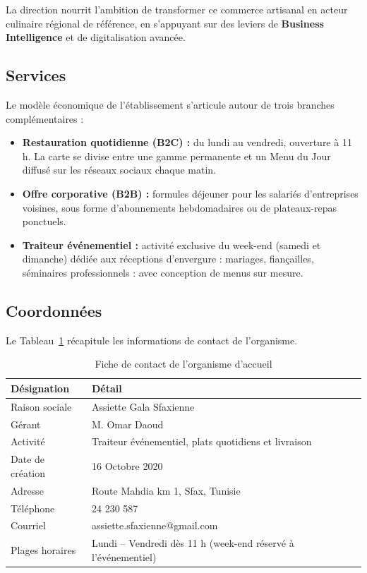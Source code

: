 La direction nourrit l'ambition de transformer ce commerce artisanal en acteur culinaire régional de référence, en s'appuyant sur des leviers de \textbf{Business Intelligence} et de digitalisation avancée.

\subsection{Services}

Le modèle économique de l'établissement s'articule autour de trois branches complémentaires :

\begin{itemize}
    \item \textbf{Restauration quotidienne (B2C) :} du lundi au vendredi, ouverture à 11 h. La carte se divise entre une gamme permanente et un \og Menu du Jour \fg{} diffusé sur les réseaux sociaux chaque matin.
    \item \textbf{Offre corporative (B2B) :} formules déjeuner pour les salariés d'entreprises voisines, sous forme d'abonnements hebdomadaires ou de plateaux-repas ponctuels.
    \item \textbf{Traiteur événementiel :} activité exclusive du week-end (samedi et dimanche) dédiée aux réceptions d'envergure : mariages, fiançailles, séminaires professionnels : avec conception de menus sur mesure.
\end{itemize}

\subsection{Coordonnées}

Le Tableau~\ref{tab:fiche_entreprise} récapitule les informations de contact de l'organisme.

\begin{table}[H]
    \centering
    \caption{Fiche de contact de l'organisme d'accueil}
    \label{tab:fiche_entreprise}
    \begin{tabular}{|l|p{8cm}|}
        \hline
        \textbf{Désignation} & \textbf{Détail} \\
        \hline
        Raison sociale & Assiette Gala Sfaxienne \\
        \hline
        Gérant & M. Omar Daoud \\
        \hline
        Activité & Traiteur événementiel, plats quotidiens et livraison \\
        \hline
        Date de création & 16 Octobre 2020 \\
        \hline
        Adresse & Route Mahdia km 1, Sfax, Tunisie \\
        \hline
        Téléphone & 24 230 587 \\
        \hline
        Courriel & assiette.sfaxienne@gmail.com \\
        \hline
        Plages horaires & Lundi -- Vendredi dès 11 h (week-end réservé à l'événementiel) \\
        \hline
    \end{tabular}
\end{table}

